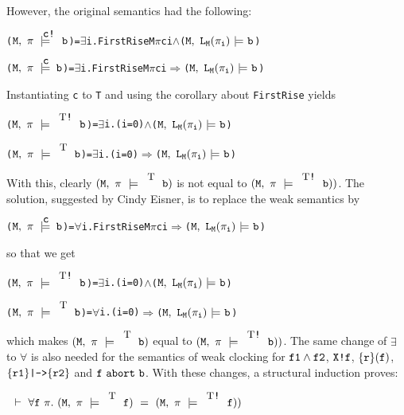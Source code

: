 \documentclass{llncs}
\newcommand{\And}{\(\wedge\)}
\newcommand{\Imp}{\(\Rightarrow\)}
\newcommand{\Forall}{\(\forall\)}
\newcommand{\Exists}{\(\exists\)}
\newcommand{\T}{\texttt{\small\rm{T}}}
\renewcommand{\Pi}{\(\pi\)}
\newcommand{\BSem}[3]{(\(\tt#1,~#2~{\models}~#3\))}
\newcommand{\sSem}[4]{(\tt{#1,~#2~\models^{\hspace*{-2.3mm}\raisebox{1mm}{\tt#3}}~#4})}
\newcommand{\FSem}[4]{(\(\tt{#1,~#2~\models^{\hspace*{-2.3mm}\raisebox{1mm}{\tt#3}}~#4}\))}
\newcommand{\fSem}[4]{(\tt{#1,~#2~\models^{\hspace*{-2.3mm}\raisebox{1mm}{\tt#3}}~#4})}
\newcommand{\FBool}[1]{#1}
\newcommand{\weakClock}[1]{#1}
\newcommand{\strongClock}[1]{#1!}
\newcommand{\pathEl}[2]{#1_{#2}}
\newcommand{\lNoHat}[1]{{\texttt{L}}_{#1}}
\newcommand{\fAnd}[2]{#1 \wedge #2}
\newcommand{\fNext}[1]{\texttt{X!}#1}
\newcommand{\fSuffixImp}[2]{\{#1\}(#2)}
\newcommand{\fWeakImp}[2]{\{#1\}\texttt{|->}\{#2\}}
\newcommand{\fAbort}[2]{#1~\texttt{abort}~#2}
\renewcommand{\t}[1]{\texttt{#1}}
\begin{document}
However, the original semantics had the following:

{\begin{alltt}
  {\FSem{M}{{\pi}}{{\strongClock{c}}}{\FBool{b}}} = {\Exists}i. FirstRise M {\Pi} c i {\And} {\BSem{M}{\lNoHat{M}(\pathEl{{\pi}}{i})}{b}}

  {\FSem{M}{{\pi}}{{\weakClock{c}}}{{\FBool{b}}}}  = {\Exists}i. FirstRise M {\Pi} c i {\Imp} {\BSem{M}{\lNoHat{M}(\pathEl{{\pi}}{i})}{b}}
\end{alltt}}


Instantiating \t{c} to \T{} and using the corollary about \t{FirstRise} yields


{\begin{alltt}
  {\FSem{M}{{\pi}}{{\strongClock{\T}}}{\FBool{b}}} = {\Exists}i. (i=0) {\And} {\BSem{M}{\lNoHat{M}(\pathEl{{\pi}}{i})}{b}}

  {\FSem{M}{{\pi}}{{\weakClock{\T}}}{{\FBool{b}}}}  = {\Exists}i. (i=0) {\Imp} {\BSem{M}{\lNoHat{M}(\pathEl{{\pi}}{i})}{b}}
\end{alltt}}

With this, clearly $\fSem{M}{\pi}{\T}{\FBool{b}}$ is not equal to $\sSem{M}{\pi}{\T\texttt{!}}{\FBool{b}})$.
The solution, suggested by Cindy Eisner, is to replace the weak semantics by


{\begin{alltt}
  {\FSem{M}{{\pi}}{{\weakClock{c}}}{{\FBool{b}}}}  = {\Forall}i. FirstRise M {\Pi} c i {\Imp} {\BSem{M}{\lNoHat{M}(\pathEl{{\pi}}{i})}{b}}
\end{alltt}}

so that we get 


{\begin{alltt}
  {\FSem{M}{{\pi}}{{\strongClock{\T}}}{\FBool{b}}} = {\Exists}i. (i=0) {\And} {\BSem{M}{\lNoHat{M}(\pathEl{{\pi}}{i})}{b}}

  {\FSem{M}{{\pi}}{{\weakClock{\T}}}{{\FBool{b}}}}  = {\Forall}i. (i=0) {\Imp} {\BSem{M}{\lNoHat{M}(\pathEl{{\pi}}{i})}{b}}
\end{alltt}}

which makes $\fSem{M}{\pi}{\T}{\FBool{b}}$ equal to $\sSem{M}{\pi}{\T\texttt{!}}{\FBool{b}})$.
The same change of $\exists$ to $\forall$ is also needed for the semantics of weak clocking for
$\tt{\fAnd{f1}{f2}}$,  $\tt{\fNext{f}}$, $\tt{\fSuffixImp{r}{f}}$, $\tt{\fWeakImp{r1}{r2}}$ and $\tt{\fAbort{f}{b}}$.
With these changes, a structural induction proves:

\medskip

$~~\vdash~\forall{\t{f}}~\pi.~\fSem{M}{\pi}{\T}{f}~=~\sSem{M}{\pi}{\T\texttt{!}}{f})$
\end{document}
